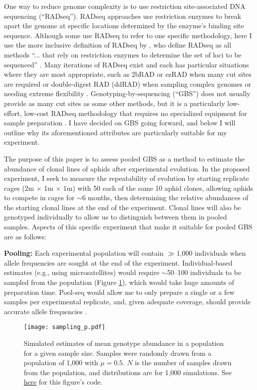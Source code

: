 One way to reduce genome complexity is to use restriction site-associated DNA 
sequencing (``RADseq'').
RADseq approaches use restriction enzymes to break apart the genome at specific 
locations determined by the enzyme's binding site sequence.
Although some use RADseq to refer to one specific methodology, here I use the more
inclusive definition of RADseq by
\citet{Andrews:2016bc}, who define RADseq as all methods 
``... that rely on restriction enzymes to determine the set of loci to be sequenced''
\citep[p 81]{Andrews:2016bc}.
Many iterations of RADseq exist and each has particular situations where they are most 
appropriate, such as 2bRAD or ezRAD when many cut sites are required or double-digest RAD
(ddRAD) when sampling complex genomes or needing extreme flexibility 
\citep{Andrews:2016bc}.
Genotyping-by-sequencing (``GBS'') does not usually provide as many cut sites as some 
other methods, but it is a particularly low-effort, low-cost RADseq methodology
that requires no specialized equipment for sample preparation \citep{Elshire:2011gn}.
I have decided on GBS going forward, and below I will outline why its aforementioned
attributes are particularly suitable for my experiment.

The purpose of this paper is to assess pooled GBS as a method to estimate the abundance 
of clonal lines of aphids after experimental evolution.
In the proposed experiment, I seek to measure the repeatability of evolution by 
starting replicate cages (2m $\times$ 1m $\times$ 1m) with 50 each of the same 10 aphid
clones, allowing aphids to compete in cages for $\sim$6 months, then determining the
relative abundances of the starting clonal lines at the end of the experiment.
Clonal lines will also be genotyped individually to allow us to distinguish between 
them in pooled samples.
Aspects of this specific experiment that make it suitable for pooled GBS are as follows:

\textbf{Pooling:}
Each experimental population will contain $\gg$1,000 individuals when allele frequencies 
are sought at the end of the experiment. Individual-based estimates (e.g., using 
microsatellites) would require $\sim$50--100  individuals to be sampled from the 
population (Figure \ref{fig:sampling}), which would take huge amounts of preparation time.
Pool-seq would allow me to only prepare a single or a few samples per  experimental 
replicate, and, given adequate coverage, should provide accurate allele frequencies 
\citep{Schlotterer:2014dk}.


\begin{figure}[!ht]
    \centering
    \texttt{[image: sampling\_p.pdf]}
    \caption{Simulated estimates of mean genotype abundance in a population for a given
        sample size. Samples were randomly drawn from a population of 1,000 with 
        $\mu = 0.5$. $N$ is the number of samples drawn from the population, and 
        distributions are for 1,000 simulations.
        See \href{https://github.com/lucasnell/mol_ecol/blob/master/samp_plot.R}{here} 
        for this figure's code.}
    \label{fig:sampling}
\end{figure}




